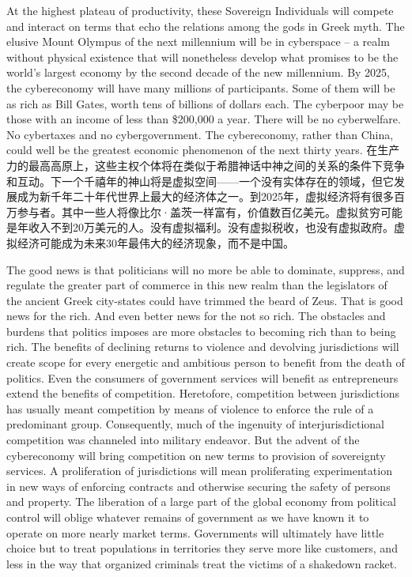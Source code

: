 \begin{Parallel}{97mm}{45mm}
  \ParallelLText
  {At the highest plateau of productivity, these Sovereign Individuals will compete and interact on terms that echo the relations among the gods in Greek myth. The elusive Mount Olympus of the next millennium will be in cyberspace -- a realm without physical existence that will nonetheless develop what promises to be the world's largest economy by the second decade of the new millennium. By 2025, the cybereconomy will have many millions of participants. Some of them will be as rich as Bill Gates, worth tens of billions of dollars each. The cyberpoor may be those with an income of less than \$200,000 a year. There will be no cyberwelfare. No cybertaxes and no cybergovernment. The cybereconomy, rather than China, could well be the greatest economic phenomenon of the next thirty years.   }
 \ParallelRText
  {\small 在生产力的最高高原上，这些主权个体将在类似于希腊神话中神之间的关系的条件下竞争和互动。下一个千禧年的神山将是虚拟空间——一个没有实体存在的领域，但它发展成为新千年二十年代世界上最大的经济体之一。到2025年，虚拟经济将有很多百万参与者。其中一些人将像比尔·盖茨一样富有，价值数百亿美元。虚拟贫穷可能是年收入不到20万美元的人。没有虚拟福利。没有虚拟税收，也没有虚拟政府。虚拟经济可能成为未来30年最伟大的经济现象，而不是中国。}

  \ParallelPar  
  \ParallelLText
  {The good news is that politicians will no more be able to dominate, suppress, and regulate the greater part of commerce in this new realm than the legislators of the ancient Greek city-states could have trimmed the beard of Zeus. That is good news for the rich. And even better news for the not so rich. The obstacles and burdens that politics imposes are more obstacles to becoming rich than to being rich.    The benefits of declining returns to violence and devolving jurisdictions will create scope for every energetic and ambitious person to benefit from the death of politics. Even the consumers of government services will benefit as entrepreneurs extend the benefits of competition. Heretofore, competition between jurisdictions has usually meant competition by means of violence to enforce the rule of a predominant group. Consequently, much of the ingenuity of interjurisdictional competition was channeled into military endeavor. But the advent of the cybereconomy will bring competition on new terms to provision of sovereignty services. A proliferation of jurisdictions will mean proliferating experimentation in new ways of enforcing contracts and otherwise securing the safety of persons and property. The liberation of a large part of the global economy from political control will oblige whatever remains of government as we have known it to operate on more nearly market terms. Governments will ultimately have little choice but to treat populations in territories they serve more like customers, and less in the way that organized criminals treat the victims of a shakedown racket. }
  

\end{Parallel}
